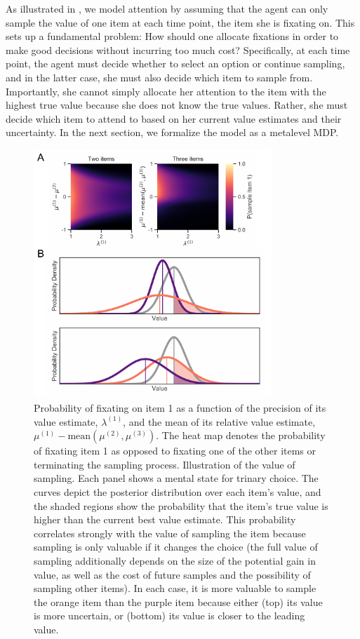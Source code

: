 As illustrated in , we model attention by assuming that the agent can only sample the value of one item at each time point, the item she is fixating on. This sets up a fundamental problem: How should one allocate fixations in order to make good decisions without incurring too much cost? Specifically, at each time point, the agent must decide whether to select an option or continue sampling, and in the latter case, she must also decide which item to sample from. Importantly, she cannot simply allocate her attention to the item with the highest true value because she does not know the true values. Rather, she must decide which item to attend to based on her current value estimates and their uncertainty. In the next section, we formalize the model as a metalevel MDP.


\begin{figure}[tb!]
  \centering
  \includegraphics[width=0.8\textwidth]{figs/attention/Fig2.pdf}
  \caption{
   Probability of fixating on item 1 as a function of the precision of its value estimate, $\lambda^{(1)}$, and the mean of its relative value estimate, $\mu^{(1)}-\mathrm{mean}(\mu^{(2)},\mu^{(3)})$. The heat map denotes the probability of fixating item 1 as opposed to fixating one of the other items or terminating the sampling process.
   Illustration of the value of sampling. Each panel shows a mental state for trinary choice. The curves depict the posterior distribution over each item's value, and the shaded regions show the probability that the item's true value is higher than the current best value estimate. This probability correlates strongly with the value of sampling the item because sampling is only valuable if it changes the choice (the full value of sampling additionally depends on the size of the potential gain in value, as well as the cost of future samples and the possibility of sampling other items). In each case, it is more valuable to sample the orange item than the purple item because either (top) its value is more uncertain, or (bottom) its value is closer to the leading value.
  }
  \label{fig:attention2}
\end{figure}

